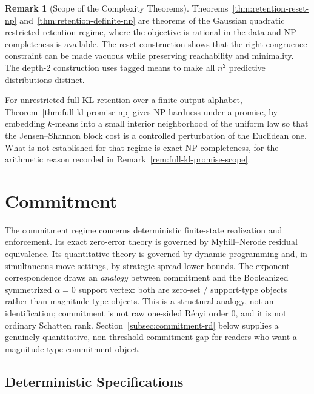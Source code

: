 \documentclass[12pt]{article}
\theoremstyle{definition}
\newtheorem{remark}[theorem]{Remark}
\begin{document}
\begin{remark}[Scope of the Complexity Theorems]
\label{rem:complexity-scope}
Theorems~\ref{thm:retention-reset-np}
and~\ref{thm:retention-definite-np} are theorems of the Gaussian quadratic
restricted retention regime, where the objective is rational in the data and
NP-completeness is available.  The reset construction shows that the
right-congruence constraint can be made vacuous while preserving reachability
and minimality.  The depth-$2$ construction uses tagged means to make all
$n^2$ predictive distributions distinct.

For unrestricted full-KL retention over a finite output alphabet,
Theorem~\ref{thm:full-kl-promise-np} gives NP-hardness under a promise, by
embedding $k$-means into a small interior neighborhood of the uniform law so
that the Jensen--Shannon block cost is a controlled perturbation of the
Euclidean one.  What is not established for that regime is exact
NP-completeness, for the arithmetic reason recorded in
Remark~\ref{rem:full-kl-promise-scope}.
\end{remark}

\section{Commitment}
\label{sec:commitment}

The commitment regime concerns deterministic finite-state realization and
enforcement.  Its exact zero-error theory is governed by Myhill--Nerode
residual equivalence.  Its quantitative theory is governed by dynamic
programming and, in simultaneous-move settings, by strategic-spread lower
bounds.  The exponent correspondence draws an \emph{analogy} between commitment and
the Booleanized symmetrized $\alpha=0$ support vertex: both are zero-set /
support-type objects rather than magnitude-type objects.  This is a structural
analogy, not an identification; commitment is not raw one-sided R\'enyi order
$0$, and it is not ordinary Schatten rank.  Section~\ref{subsec:commitment-rd}
below supplies a genuinely quantitative, non-threshold commitment gap for
readers who want a magnitude-type commitment object.

\subsection{Deterministic Specifications}
\label{subsec:det-spec}
\end{document}
